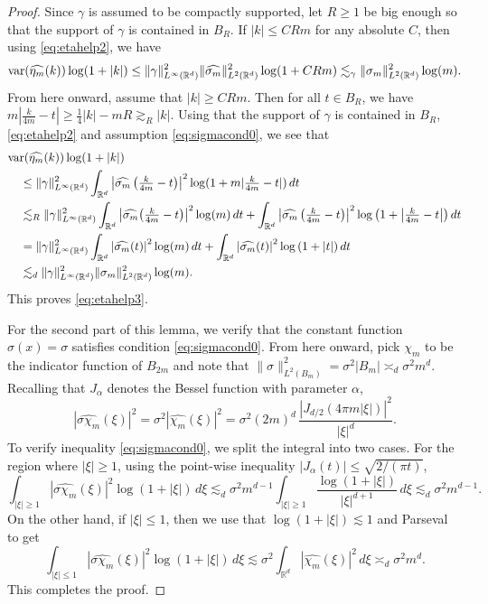 \documentclass[11pt]{article}
\theoremstyle{definition}
\numberwithin{theorem}{section}
\numberwithin{lemma}{section}
\numberwithin{equation}{section}
\def\R{\mathbb{R}}
\renewcommand{\hat}{\widehat}
\newcommand{\var}{{\rm var}}
\newcommand{\round}[1]{{\left(#1\right)}}
\numberwithin{equation}{section}
\begin{document}
\begin{proof}
		Since $\gamma$ is assumed to be compactly supported, let $R\geq 1$ be big enough so that the support of $\gamma$ is contained in $B_R$. If $|k|\leq CRm$ for any absolute $C$, then using \eqref{eq:etahelp2}, we have
		$$
		\var(\hat{\eta_m}(k)) \log(1+|k|)
		\leq \|\gamma\|_{L^\infty(\R^d)}^2 \|\hat{\sigma_m}\|_{L^2(\R^d)}^2 \log(1+CRm)
		\lesssim_{\gamma} \|\sigma_m \|_{L^2(\R^d)}^2 \log(m). 
		$$ 
		From here onward, assume that $|k|\geq CRm$. Then for all $t\in B_R$, we have $m|\frac k{4m}-t|\geq \frac 1 4 |k|-mR\gtrsim_R |k|$. Using that the support of $\gamma$ is contained in $B_R$, \eqref{eq:etahelp2} and assumption \eqref{eq:sigmacond0}, we see that 
		\begin{equation}
			\begin{split}
			&\var(\hat{\eta_m}(k)) \log(1+|k|) \\
			&\quad \leq \|\gamma\|_{L^\infty(\R^d)}^2 \int_{\R^d} \left| \hat {\sigma_m}\left(\tfrac k{4m}-t \right) \right|^2 \log(1+m|\tfrac k{4m}-t|) \, dt  \\
			&\quad \lesssim_R \|\gamma\|_{L^\infty(\R^d)}^2 \int_{\R^d} \left| \hat{\sigma_m} \round{\tfrac{k}{4m}-t}\right|^2 \log(m) \, dt + \int_{\R^d} \left| \hat {\sigma_m}\left(\tfrac k{4m}-t \right) \right|^2  \log\round{1+\left|\tfrac{k}{4m}-t\right|} \, dt \\
			&\quad = \|\gamma\|_{L^\infty(\R^d)}^2 \int_{\R^d} \left| \hat{\sigma_m} (t)\right|^2 \log(m) \, dt + \int_{\R^d} \left| \hat {\sigma_m}(t) \right|^2  \log\round{1+|t|} \, dt \\
			&\quad \lesssim_d \|\gamma\|_{L^\infty(\R^d)}^2 \|\sigma_m \|_{L^2(\R^d)}^2 \log(m).
		\end{split} \label{eq:etahelp4}
		\end{equation}
		This proves \eqref{eq:etahelp3}.
		
		For the second part of this lemma, we verify that the constant function $\sigma(x)=\sigma$ satisfies condition \eqref{eq:sigmacond0}. From here onward, pick $\chi_m$ to be the indicator function of $B_{2m}$ and note that $\|\sigma\|_{L^2(B_m)}^2=\sigma^2 |B_m|\asymp_d \sigma^2 m^d$. Recalling that $J_\alpha$ denotes the Bessel function with parameter $\alpha$,
		$$
		|\hat{\sigma\chi_m}(\xi)|^2
		= \sigma^2 |\hat{\chi_m}(\xi)|^2 
		= \sigma^2 (2m)^d \, \frac{|J_{d/2}(4\pi m|\xi|)|^2}{|\xi|^d}.
		$$
		To verify inequality \eqref{eq:sigmacond0}, we split the integral into two cases. For the region where $|\xi|\geq 1$, using the point-wise inequality $|J_\alpha(t)|\leq \sqrt{2/(\pi t)}$, 
		$$
		\int_{|\xi|\geq 1} |\hat{\sigma \chi_m}(\xi)|^2 \log(1+|\xi|) \, d\xi 
		\lesssim_d \sigma^2 m^{d-1} \int_{|\xi|\geq 1} \frac{\log(1+|\xi|)}{|\xi|^{d+1}} \, d\xi
		\lesssim_d \sigma^2 m^{d-1}.
		$$
		On the other hand, if $|\xi|\leq 1$, then we use that $\log(1+|\xi|)\lesssim 1$ and Parseval to get 
		$$
		\int_{|\xi|\leq 1} |\hat{\sigma \chi_m}(\xi)|^2 \log(1+|\xi|) \, d\xi 
		\lesssim \sigma^2 \int_{\R^d} |\hat{\chi_m}(\xi)|^2 \, d\xi
		\asymp_d \sigma^2 m^d.
		$$
		This completes the proof.
	\end{proof}
	

\end{document}
